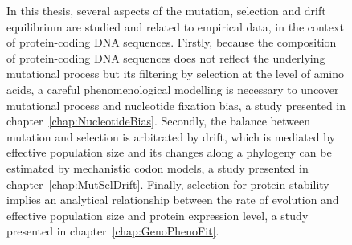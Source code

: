 \begin{figure}[H]
    \centering
    \caption[Goal of the thesis]{
    In this thesis, several aspects of the mutation, selection and drift equilibrium are studied and related to empirical data, in the context of protein-coding \acrshort{DNA} sequences.
    Firstly, because the composition of protein-coding \acrshort{DNA} sequences does not reflect the underlying mutational process but its filtering by selection at the level of amino acids, a careful phenomenological modelling is necessary to uncover mutational process and nucleotide fixation bias, a study presented in chapter~\ref{chap:NucleotideBias}.
    Secondly, the balance between mutation and selection is arbitrated by drift, which is mediated by \gls{effective population size} and its changes along a phylogeny can be estimated by mechanistic \gls{codon} models, a study presented in chapter~\ref{chap:MutSelDrift}.
    Finally, selection for protein stability implies an analytical relationship between the rate of evolution and \gls{effective population size} and protein expression level, a study presented in chapter~\ref{chap:GenoPhenoFit}.
    }
    \label{fig:goals}
\end{figure}

